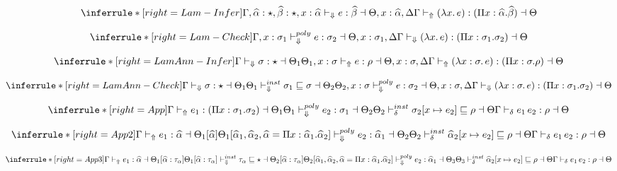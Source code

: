 \[
\inferrule*[right=Lam-Infer]
{\Gamma, \widehat{\alpha}:\star, \widehat{\beta}:\star, x: \widehat \alpha \checktypeno e : \widehat \beta \dashv \Theta, x:\widehat \alpha , \Delta}
{\infertype (\lambda x.\, e) : (\Pi x: \widehat \alpha. \widehat \beta) \dashv \Theta}
\]

\[
\inferrule*[right=Lam-Check]
{\Gamma,x: \sigma_1 \polycheckno e : \sigma_2 \dashv \Theta, x: \sigma_1, \Delta}
{\checktype (\lambda x.\, e) : (\Pi x: \sigma_1. \sigma_2) \dashv \Theta}
\]

\[
\inferrule*[right=LamAnn-Infer]
{
\checktype \sigma:\star \dashv \Theta_1 \\
\Theta_1, x: \sigma \infertypeno e : \rho \dashv \Theta, x:\sigma, \Delta }
{\infertype (\lambda x:\sigma.\, e) : (\Pi x: \sigma. \rho)\dashv \Theta}
\]

\[
\inferrule*[right=LamAnn-Check]
{
\checktype \sigma:\star \dashv \Theta_1 \\
\Theta_1 \instcheck \sigma_1 \sqsubseteq \sigma \dashv \Theta_2 \\
\Theta_2,x: \sigma \polycheckno e : \sigma_2 \dashv \Theta, x:\sigma, \Delta }
{\checktype (\lambda x:\sigma.\, e) : (\Pi x: \sigma_1. \sigma_2) \dashv \Theta}
\]

\[
\inferrule*[right=App]
{\infertype e_1 : (\Pi x:\sigma_1. \sigma_2) \dashv \Theta_1 \\
\Theta_1 \polycheckno e_2 : \sigma_1 \dashv \Theta_2 \\
\Theta_2 \instinfercheck \sigma_2 [\tpmapsto {\sigma_1} x {e_2}] \sqsubseteq \rho \dashv \Theta}
{\infercheck e_1\,e_2 : \rho \dashv \Theta}
\]

\[
\inferrule*[right=App2]
{\infertype e_1 : \widehat \alpha \dashv \Theta_1[\widehat \alpha] \\
\Theta_1[\widehat \alpha_1, \widehat \alpha_2, \widehat \alpha = \Pi x:\widehat \alpha_1. \widehat \alpha_2] \polycheckno e_2 : \widehat \alpha_1 \dashv \Theta_2 \\
\Theta_2 \instinfercheck \widehat \alpha_2 [\tpmapsto {\sigma_1} x {e_2}] \sqsubseteq \rho \dashv \Theta}
{\infercheck e_1\,e_2 : \rho \dashv \Theta}
\]

\[
\inferrule*[right=App3]
{\infertype e_1 : \widehat \alpha \dashv \Theta_1[\widehat \alpha:\tau_\alpha] \\
\Theta_1[\widehat \alpha:\tau_\alpha] \instcheck \tau_\alpha \sqsubseteq \star \dashv \Theta_2[\widehat \alpha:\tau_\alpha] \\
\Theta_2[\widehat \alpha_1, \widehat \alpha_2, \widehat \alpha = \Pi x:\widehat \alpha_1. \widehat \alpha_2] \polycheckno e_2 : \widehat \alpha_1 \dashv \Theta_3 \\
\Theta_3 \instinfercheck \widehat \alpha_2 [\tpmapsto {\sigma_1} x {e_2}] \sqsubseteq \rho \dashv \Theta}
{\infercheck e_1\,e_2 : \rho \dashv \Theta}
\]

